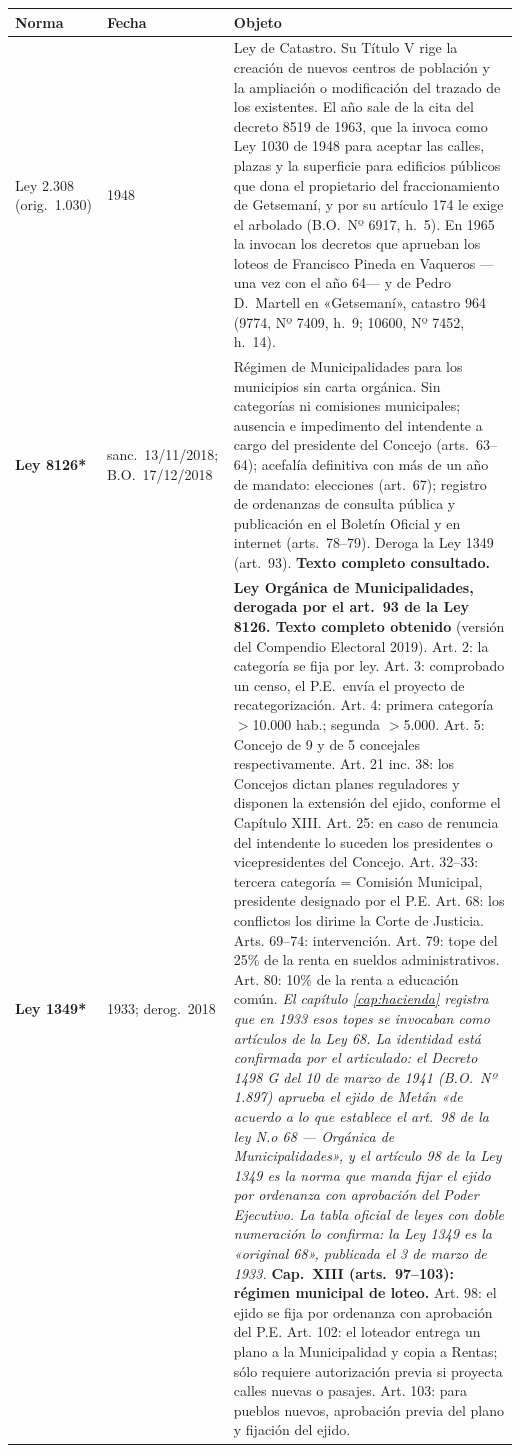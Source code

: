 \begin{longtable}{@{}p{3.2cm}p{1.9cm}p{7.9cm}@{}}
\toprule
\textbf{Norma} & \textbf{Fecha} & \textbf{Objeto} \\
\midrule
\endhead
Ley 2.308 (orig.\ 1.030) & 1948 & Ley de Catastro. Su Título V rige la creación de nuevos centros de población y la ampliación o modificación del trazado de los existentes. El año sale de la cita del decreto 8519 de 1963, que la invoca como Ley 1030 de 1948 para aceptar las calles, plazas y la superficie para edificios públicos que dona el propietario del fraccionamiento de Getsemaní, y por su artículo 174 le exige el arbolado (B.O.\ Nº 6917, h.\ 5). En 1965 la invocan los decretos que aprueban los loteos de Francisco Pineda en Vaqueros ---una vez con el año 64--- y de Pedro D.\ Martell en «Getsemaní», catastro 964 (9774, Nº 7409, h.\ 9; 10600, Nº 7452, h.\ 14). \\
\textbf{Ley 8126*} & sanc.\ 13/11/2018; B.O.\ 17/12/2018 & Régimen de Municipalidades para los municipios sin carta orgánica. Sin categorías ni comisiones municipales; ausencia e impedimento del intendente a cargo del presidente del Concejo (arts.\ 63--64); acefalía definitiva con más de un año de mandato: elecciones (art.\ 67); registro de ordenanzas de consulta pública y publicación en el Boletín Oficial y en internet (arts.\ 78--79). Deroga la Ley 1349 (art.\ 93). \textbf{Texto completo consultado.} \\
\textbf{Ley 1349*} & 1933; derog.\ 2018 & \textbf{Ley Orgánica de Municipalidades, derogada por el art.\ 93 de la Ley 8126. Texto completo obtenido} (versión del Compendio Electoral 2019). Art. 2: la categoría se fija por ley. Art. 3: comprobado un censo, el P.E.\ envía el proyecto de recategorización. Art. 4: primera categoría $>$10.000 hab.; segunda $>$5.000. Art. 5: Concejo de 9 y de 5 concejales respectivamente. Art. 21 inc. 38: los Concejos dictan planes reguladores y disponen la extensión del ejido, conforme el Capítulo XIII. Art. 25: en caso de renuncia del intendente lo suceden los presidentes o vicepresidentes del Concejo. Art. 32--33: tercera categoría = Comisión Municipal, presidente designado por el P.E. Art. 68: los conflictos los dirime la Corte de Justicia. Arts. 69--74: intervención. Art. 79: tope del 25\% de la renta en sueldos administrativos. Art. 80: 10\% de la renta a educación común. \textit{El capítulo \ref{cap:hacienda} registra que en 1933 esos topes se invocaban como artículos de la Ley 68. La identidad está confirmada por el articulado: el Decreto 1498 G del 10 de marzo de 1941 (B.O.\ Nº 1.897) aprueba el ejido de Metán «de acuerdo a lo que establece el art.\ 98 de la ley N.o 68 --- Orgánica de Municipalidades», y el artículo 98 de la Ley 1349 es la norma que manda fijar el ejido por ordenanza con aprobación del Poder Ejecutivo. La tabla oficial de leyes con doble numeración lo confirma: la Ley 1349 es la «original 68», publicada el 3 de marzo de 1933.} \textbf{Cap.\ XIII (arts.\ 97--103): régimen municipal de loteo.} Art. 98: el ejido se fija por ordenanza con aprobación del P.E. Art. 102: el loteador entrega un plano a la Municipalidad y copia a Rentas; sólo requiere autorización previa si proyecta calles nuevas o pasajes. Art. 103: para pueblos nuevos, aprobación previa del plano y fijación del ejido. \\

\end{longtable}
